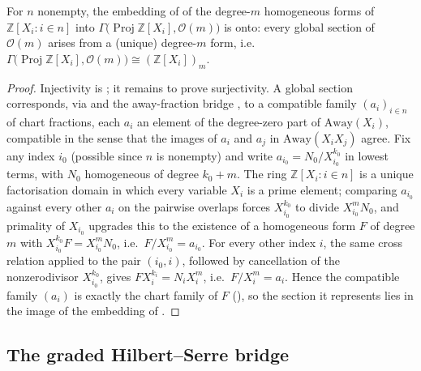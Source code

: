 \begin{lemma}\leanok
  \label{lem:serre_twist_sections}
  For \(n\) nonempty, the embedding of  of
  the degree-\(m\) homogeneous forms of \(\mathbb Z[X_i : i \in n]\) into
  \(\Gamma\bigl(\operatorname{Proj}\mathbb Z[X_i], \mathcal O(m)\bigr)\) is
  onto: every global section of \(\mathcal O(m)\) arises from a (unique)
  degree-\(m\) form, i.e.
  \(\Gamma\bigl(\operatorname{Proj}\mathbb Z[X_i], \mathcal O(m)\bigr)
  \cong (\mathbb Z[X_i])_m\).
\end{lemma}
\begin{proof}\leanok
  Injectivity is ; it remains to prove
  surjectivity. A global section corresponds, via
   and the away-fraction bridge
  , to a compatible family
  \((a_i)_{i \in n}\) of chart fractions, each \(a_i\) an element of the
  degree-zero part of \(\mathrm{Away}(X_i)\), compatible in the sense
  that the images of \(a_i\) and \(a_j\) in \(\mathrm{Away}(X_i X_j)\)
  agree. Fix any index \(i_0\) (possible since \(n\) is nonempty) and
  write \(a_{i_0} = N_0/X_{i_0}^{k_0}\) in lowest terms, with \(N_0\)
  homogeneous of degree \(k_0 + m\). The ring \(\mathbb Z[X_i : i \in n]\)
  is a unique factorisation domain in which every variable \(X_i\) is a
  prime element; comparing \(a_{i_0}\) against every other \(a_i\) on the
  pairwise overlaps forces \(X_{i_0}^{k_0}\) to divide \(X_{i_0}^m N_0\),
  and primality of \(X_{i_0}\) upgrades this to the existence of a
  homogeneous form \(F\) of degree \(m\) with
  \(X_{i_0}^{k_0} F = X_{i_0}^m N_0\), i.e.\ \(F/X_{i_0}^m = a_{i_0}\).
  For every other index \(i\), the same cross relation applied to the
  pair \((i_0, i)\), followed by cancellation of the nonzerodivisor
  \(X_{i_0}^{k_0}\), gives \(F X_i^{k_i} = N_i X_i^m\), i.e.\
  \(F/X_i^m = a_i\). Hence the compatible family \((a_i)\) is exactly the
  chart family of \(F\) (\Cref{lem:serre_twist_form_compatible}), so the
  section it represents lies in the image of the embedding of
  .
\end{proof}

\subsection{The graded Hilbert--Serre bridge}
\label{subsec:graded_hilbert_bridge}

